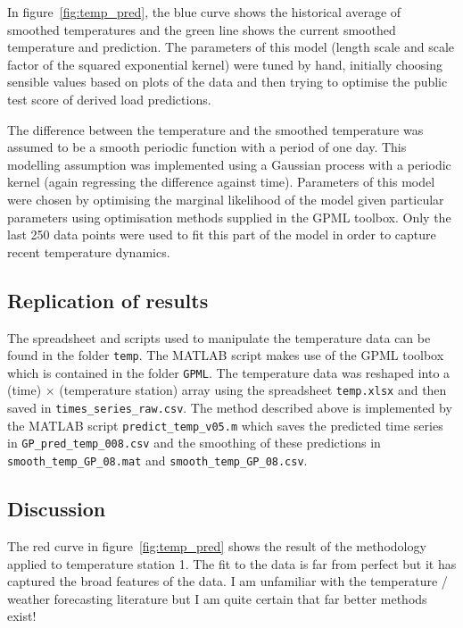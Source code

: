 \documentclass[preprint,authoryear,12pt]{elsarticle}
\begin{document}
In figure~\ref{fig:temp_pred}, the blue curve shows the historical average of smoothed temperatures and the green line shows the current smoothed temperature and prediction.
The parameters of this model (length scale and scale factor of the squared exponential kernel) were tuned by hand, initially choosing sensible values based on plots of the data and then trying to optimise the public test score of derived load predictions.

The difference between the temperature and the smoothed temperature was assumed to be a smooth periodic function with a period of one day.
This modelling assumption was implemented using a Gaussian process with a periodic kernel (again regressing the difference against time).
Parameters of this model were chosen by optimising the marginal likelihood of the model given particular parameters using optimisation methods supplied in the GPML toolbox\footnotemark.
Only the last 250 data points were used to fit this part of the model in order to capture recent temperature dynamics.

\subsection{Replication of results}

The spreadsheet and scripts used to manipulate the temperature data can be found in the folder \texttt{temp}.
The MATLAB script makes use of the GPML toolbox which is contained in the folder \texttt{GPML}.
The temperature data was reshaped into a (time) $\times$ (temperature station) array using the spreadsheet \texttt{temp.xlsx} and then saved in \texttt{times\_series\_raw.csv}.
The method described above is implemented by the MATLAB script \texttt{predict\_temp\_v05.m} which saves the predicted time series in \texttt{GP\_pred\_temp\_008.csv} and the smoothing of these predictions in \texttt{smooth\_temp\_GP\_08.mat} and \texttt{smooth\_temp\_GP\_08.csv}.

\subsection{Discussion}

The red curve in figure~\ref{fig:temp_pred} shows the result of the methodology applied to temperature station 1.
The fit to the data is far from perfect but it has captured the broad features of the data.
I am unfamiliar with the temperature / weather forecasting literature but I am quite certain that far better methods exist!
\end{document}
